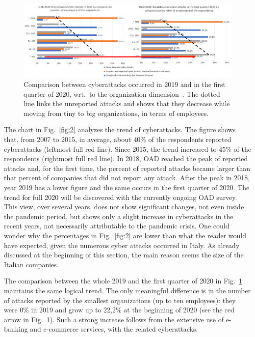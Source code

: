 \documentclass{easychair}
\begin{document}
\begin{figure}
	\begin{center}
		\includegraphics[scale=0.52]{pictures/fig3.png}
	\end{center}
  \caption{Comparison between cyberattacks occurred in 2019 and in the first quarter of 2020,
    wrt.\ to the organization dimension~\cite{oad20}. The dotted line links
    the unreported attacks and shows that they decrease while moving from tiny to big organizations,
    in terms of employees.}
  \label{fig:3}
\end{figure}

The chart in Fig.~\ref{fig:2} analyzes the trend of cyberattacks.
The figure shows that, from 2007 to 2015, in average, about 40\% of the respondents
reported cyberattacks (leftmost full red line). Since 2015, the trend increased to 45\%
of the respondents (rightmost full red line). 
In 2018, OAD reached the peak of reported attacks and, for the first time, the percent of
reported attacks became larger than that percent of companies that did not report any attack.
After the peak 
in 2018, year 2019 has a lower figure and the same occurs in the first quarter of 2020.
The trend for full 2020 will be discovered with the currently ongoing OAD survey.
This view, over several years, does not show significant changes, not even inside
the pandemic period, but shows only a slight increase in cyberattacks 
in the recent years, not necessarily attributable to the pandemic crisis. One could wonder
why the percentages in Fig.~\ref{fig:2} are lower than what the reader would have expected, 
given the numerous cyber attacks occurred in Italy. As already discussed at the beginning of 
this section, the main reason seems the size of the Italian companies.

The comparison between the whole 2019 and the first quarter of 2020
in Fig.~\ref{fig:3} maintains the same logical trend. The only meaningful difference
is in the number of attacks reported by the smallest
organizations (up to ten employees): they were 0\% in 2019 and grow up to
22,2\% at the beginning of 2020 (see the red arrow in Fig.~\ref{fig:3}).
Such a strong increase follows from the extensive use of e-banking and 
e-commerce services, with the related cyberattacks.
\end{document}
